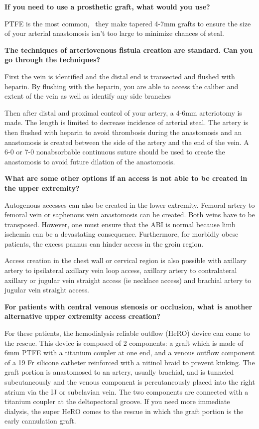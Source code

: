 \documentclass[
]{book}
\begin{document}
\textbf{If you need to use a prosthetic graft, what would you use?}

PTFE is the most common,~ they make tapered 4-7mm grafts to ensure the
size of your arterial anastomosis isn't too large to minimize chances of
steal.

\textbf{The techniques of arteriovenous fistula creation are standard. Can you
go through the techniques?}

First the vein is identified and the distal end is transected and
flushed with heparin. By flushing with the heparin, you are able to
access the caliber and extent of the vein as well as identify any side
branches

Then after distal and proximal control of your artery, a 4-6mm
arteriotomy is made. The length is limited to decrease incidence of
arterial steal. The artery is then flushed with heparin to avoid
thrombosis during the anastomosis and an anastomosis is created between
the side of the artery and the end of the vein. A 6-0 or 7-0
nonabsorbable continuous suture should be used to create the anastomosis
to avoid future dilation of the anastomosis.

\textbf{What are some other options if an access is not able to be created in
the upper extremity?}

Autogenous accesses can also be created in the lower extremity. Femoral
artery to femoral vein or saphenous vein anastomosis can be created.
Both veins have to be transposed. However, one must ensure that the ABI
is normal because limb ischemia can be a devastating consequence.
Furthermore, for morbidly obese patients, the excess pannus can hinder
access in the groin region.

Access creation in the chest wall or cervical region is also possible
with axillary artery to ipsilateral axillary vein loop access, axillary
artery to contralateral axillary or jugular vein straight access (ie
necklace access) and brachial artery to jugular vein straight access.

\textbf{For patients with central venous stenosis or occlusion, what is
another alternative upper extremity access creation?}

For these patients, the hemodialysis reliable outflow (HeRO) device can
come to the rescue. This device is composed of 2 components: a graft
which is made of 6mm PTFE with a titanium coupler at one end, and a
venous outflow component of a 19 Fr silicone catheter reinforced with a
nitinol braid to prevent kinking. The graft portion is anastomosed to an
artery, usually brachial, and is tunneled subcutaneously and the venous
component is percutaneously placed into the right atrium via the IJ or
subclavian vein. The two components are connected with a titanium
coupler at the deltopectoral groove. If you need more immediate
dialysis, the super HeRO comes to the rescue in which the graft portion
is the early cannulation graft.
\end{document}
